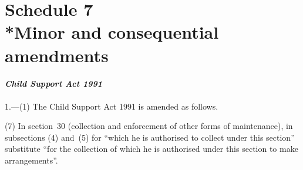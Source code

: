 \documentclass[12pt,a4paper]{article}
\begin{document}
%
%
%
%
%
%

\part[Schedule 7 --- Minor and consequential amendments]{Schedule 7\\*Minor and consequential amendments}

\renewcommand\parthead{--- Schedule 7}

\subsection*{\itshape Child Support Act 1991}

1.---(1) The Child Support Act 1991 is amended as follows.



(7) In section~30 (collection and enforcement of other forms of maintenance), in subsections (4) and~(5) for “which he is authorised to collect under this section” substitute “for the collection of which he is authorised under this section to make arrangements”.
\end{document}
